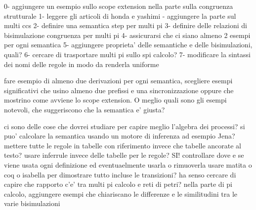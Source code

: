 
0- aggiungere un esempio sullo scope extension nella parte sulla congruenza strutturale
1- leggere gli articoli di honda e yashimi
 - aggiungere la parte sul multi ccs
2- definire una semantica step per multi pi
3- definire delle relazioni di bisimulazione congruenza per multi pi
4- assicurarsi che ci siano almeno 2 esempi per ogni semantica
5- aggiungere proprieta' delle semantiche e delle bisimulazioni, quali?
6- cercare di trasportare multi pi sullo spi calcolo?
7- modificare la sintassi dei nomi delle regole in modo da renderla uniforme


fare esempio di almeno due derivazioni per ogni semantica, scegliere esempi significativi che usino almeno due prefissi e una sincronizzazione oppure che mostrino come avviene lo scope extension.
O meglio quali sono gli esempi notevoli, che suggeriscono che la semantica e' giusta?

ci sono delle cose che dovrei studiare per capire meglio l'algebra dei processi?
si puo' calcolare la semantica usando un motore di inferenza ad esempio Jena?
mettere tutte le regole in tabelle con riferimento invece che tabelle ancorate al testo?
usare inferrule invece delle tabelle per le regole? SI!
controllare dove e se viene usata ogni definizione ed eventuaelmente usarla o rimuoverla
usare matita o coq o isabella per dimostrare tutto incluse le transizioni?
ha senso cercare di capire che rapporto c'e' tra multi pi calcolo e reti di petri?
nella parte di pi calcolo, aggiungere esempi che chiariscano le differenze e le similitudini tra le varie bisimulazioni



